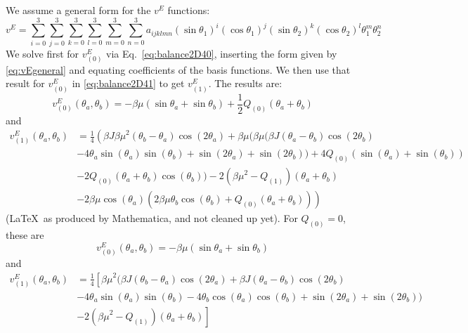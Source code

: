 \documentclass[11pt,reqno]{amsart}
\begin{document}
We assume a general form for the $v^{E}$ functions:
\begin{equation}
\label{eq:vEgeneral}
v^{E} = \sum_{i=0}^3\sum_{j=0}^3\sum_{k=0}^3\sum_{l=0}^3\sum_{m=0}^3\sum_{n=0}^3 a_{ijklmn} (\sin\theta_1)^i(\cos\theta_1)^j (\sin\theta_2)^k(\cos\theta_2)^l \theta_1^m\theta_2^n
\end{equation}
We solve first for $v^E_{(0)}$ via Eq.~\eqref{eq:balance2D40}, inserting the form given by \eqref{eq:vEgeneral} and equating coefficients of the basis functions. We then use that result for $v^E_{(0)}$ in \eqref{eq:balance2D41} to get $v^E_{(1)}$. The results are:
\begin{equation}
v^E_{(0)}(\theta_a,\theta_b) = -\beta\mu(\sin\theta_a + \sin\theta_b) + \frac{1}{2}Q_{(0)}(\theta_a + \theta_b)
\end{equation}
and
\begin{align}
v^E_{(1)}(\theta_a,\theta_b)&=\frac{1}{4} \left({\beta J} {\beta\mu}^2 ({\theta_b}-{\theta_a}) \cos (2 {\theta_a})+{\beta\mu} ({\beta\mu} ({\beta J} ({\theta_a}-{\theta_b}) \cos (2 {\theta_b})\right.\nonumber\\
&\left.-4 {\theta_a} \sin ({\theta_a}) \sin ({\theta_b})+\sin (2 {\theta_a})+\sin (2 {\theta_b}))+4 {Q_{(0)}} (\sin ({\theta_a})+\sin ({\theta_b}))\right.\nonumber\\
&\left.-2 {Q_{(0)}} ({\theta_a}+{\theta_b}) \cos ({\theta_b}))-2 \left({\beta\mu}^2-{Q_{(1)}}\right) ({\theta_a}+{\theta_b})\right.\nonumber\\
&\left.-2 {\beta\mu} \cos ({\theta_a}) (2 {\beta\mu} {\theta_b} \cos ({\theta_b})+{Q_{(0)}} ({\theta_a}+{\theta_b}))\right)
\end{align}
(\LaTeX ~as produced by Mathematica, and not cleaned up yet). For $Q_{(0)} = 0$, these are
\begin{equation}
v^E_{(0)}(\theta_a,\theta_b) = -\beta\mu(\sin\theta_a + \sin\theta_b)
\end{equation}
and
\begin{align}
v^E_{(1)}(\theta_a,\theta_b)&=\frac{1}{4} \left[{\beta\mu}^2 ({\beta J} ({\theta_b}-{\theta_a}) \cos (2 {\theta_a})+{\beta J} ({\theta_a}-{\theta_b}) \cos (2 {\theta_b})\right.\nonumber\\
&\left.-4 {\theta_a} \sin ({\theta_a}) \sin ({\theta_b})-4 {\theta_b} \cos ({\theta_a}) \cos ({\theta_b})+\sin (2 {\theta_a})+\sin (2 {\theta_b}))\right.\nonumber\\
&\left.-2 \left({\beta\mu}^2-{Q_{(1)}}\right) ({\theta_a}+{\theta_b})\right]
\end{align}
\end{document}
